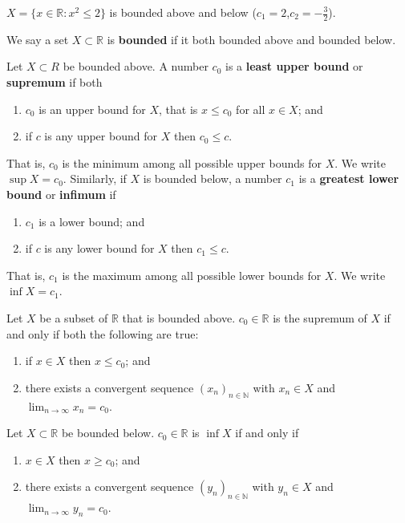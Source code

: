 \begin{example}
    $X=\{x\in\mathbb R:x^2\leq 2\}$ is bounded above and below ($c_1=2$,$c_2=-\frac32$).
\end{example}

\begin{definition}
    We say a set $X\subset\mathbb R$ is \textbf{bounded} if it both bounded above and bounded below.
\end{definition}

\begin{definition}
    Let $X\subset R$ be bounded above. A number $c_0$ is a \textbf{least upper bound} or \textbf{supremum} if both
    \begin{enumerate}
        \item $c_0$ is an upper bound for $X$, that is $x\leq c_0$ for all $x\in X$; and
        \item if $c$ is any upper bound for $X$ then $c_0\leq c$.
    \end{enumerate}
    That is, $c_0$ is the minimum among all possible upper bounds for $X$. We write $\sup{X}=c_0$. Similarly, if $X$ is bounded below, a number $c_1$ is a \textbf{greatest lower bound} or \textbf{infimum} if
    \begin{enumerate}
        \item $c_1$ is a lower bound; and
        \item if $c$ is any lower bound for $X$ then $c_1\leq c$.
    \end{enumerate}
    That is, $c_1$ is the maximum among all possible lower bounds for $X$. We write $\inf{X}=c_1$.
\end{definition}

\begin{proposition}
    Let $X$ be a subset of $\mathbb R$ that is bounded above. $c_0\in\mathbb R$ is the supremum of $X$ if and only if both the following are true:
    \begin{enumerate}
        \item if $x\in X$ then $x\leq c_0$; and
        \item there exists a convergent sequence $(x_n)_{n\in\mathbb N}$ with $x_n\in X$ and $\lim_{n\to\infty}x_n=c_0$.
    \end{enumerate}
    Let $X\subset\mathbb R$ be bounded below. $c_0\in\mathbb R$ is $\inf{X}$ if and only if
    \begin{enumerate}
        \item $x\in X$ then $x\geq c_0$; and
        \item there exists a convergent sequence $(y_n)_{n\in\mathbb N}$ with $y_n\in X$ and $\lim_{n\to\infty}y_n=c_0$.
    \end{enumerate}
\end{proposition}

